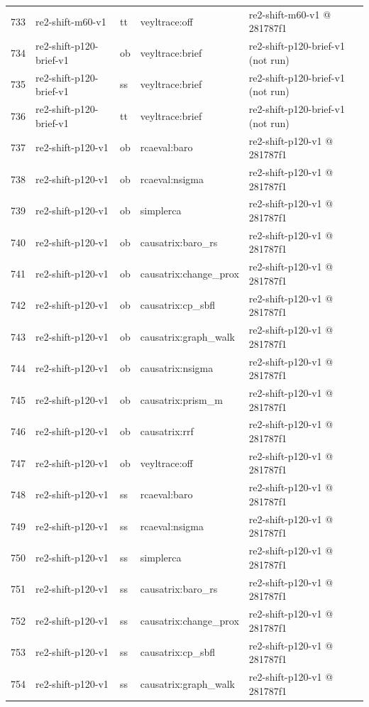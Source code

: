 \begin{longtable}{@{}r>{\raggedright\arraybackslash}p{87.0pt}>{\raggedright\arraybackslash}p{18.0pt}>{\raggedright\arraybackslash}p{63.0pt}>{\raggedright\arraybackslash}p{108.0pt}@{}}
733 & re2-shift-m60-v1 & tt & veyltrace:off & re2-shift-m60-v1 @ 281787f1 \\
734 & re2-shift-p120-brief-v1 & ob & veyltrace:brief & re2-shift-p120-brief-v1 (not run) \\
735 & re2-shift-p120-brief-v1 & ss & veyltrace:brief & re2-shift-p120-brief-v1 (not run) \\
736 & re2-shift-p120-brief-v1 & tt & veyltrace:brief & re2-shift-p120-brief-v1 (not run) \\
737 & re2-shift-p120-v1 & ob & rcaeval:baro & re2-shift-p120-v1 @ 281787f1 \\
738 & re2-shift-p120-v1 & ob & rcaeval:nsigma & re2-shift-p120-v1 @ 281787f1 \\
739 & re2-shift-p120-v1 & ob & simplerca & re2-shift-p120-v1 @ 281787f1 \\
740 & re2-shift-p120-v1 & ob & causatrix:baro\_rs & re2-shift-p120-v1 @ 281787f1 \\
741 & re2-shift-p120-v1 & ob & causatrix:change\_prox & re2-shift-p120-v1 @ 281787f1 \\
742 & re2-shift-p120-v1 & ob & causatrix:cp\_sbfl & re2-shift-p120-v1 @ 281787f1 \\
743 & re2-shift-p120-v1 & ob & causatrix:graph\_walk & re2-shift-p120-v1 @ 281787f1 \\
744 & re2-shift-p120-v1 & ob & causatrix:nsigma & re2-shift-p120-v1 @ 281787f1 \\
745 & re2-shift-p120-v1 & ob & causatrix:prism\_m & re2-shift-p120-v1 @ 281787f1 \\
746 & re2-shift-p120-v1 & ob & causatrix:rrf & re2-shift-p120-v1 @ 281787f1 \\
747 & re2-shift-p120-v1 & ob & veyltrace:off & re2-shift-p120-v1 @ 281787f1 \\
748 & re2-shift-p120-v1 & ss & rcaeval:baro & re2-shift-p120-v1 @ 281787f1 \\
749 & re2-shift-p120-v1 & ss & rcaeval:nsigma & re2-shift-p120-v1 @ 281787f1 \\
750 & re2-shift-p120-v1 & ss & simplerca & re2-shift-p120-v1 @ 281787f1 \\
751 & re2-shift-p120-v1 & ss & causatrix:baro\_rs & re2-shift-p120-v1 @ 281787f1 \\
752 & re2-shift-p120-v1 & ss & causatrix:change\_prox & re2-shift-p120-v1 @ 281787f1 \\
753 & re2-shift-p120-v1 & ss & causatrix:cp\_sbfl & re2-shift-p120-v1 @ 281787f1 \\
754 & re2-shift-p120-v1 & ss & causatrix:graph\_walk & re2-shift-p120-v1 @ 281787f1 \\

\end{longtable}
